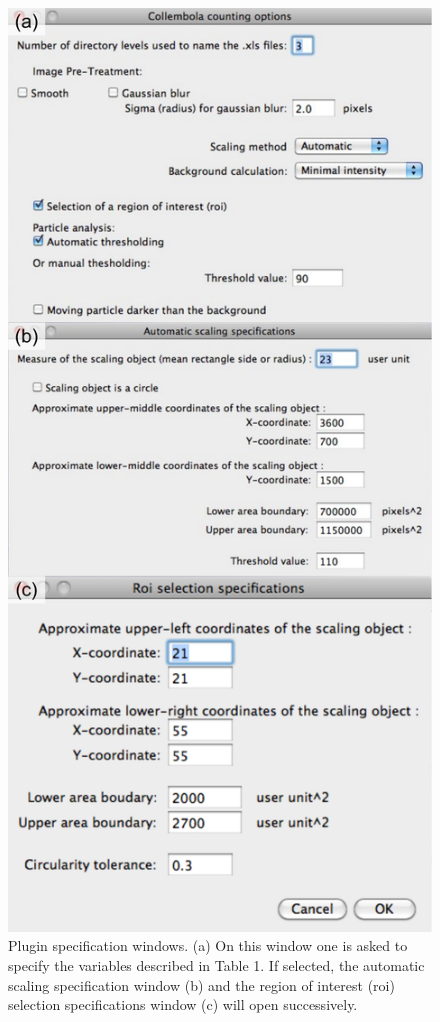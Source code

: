 \begin{figure}[!ht] %
\centering
\includegraphics[height=0.85\textheight]{2_Methodo/Fig/FigS2.pdf}
\caption[  Plugin specification windows]{ Plugin specification windows. (a) On this window one is asked to specify the variables
described in Table 1. If selected, the automatic scaling specification window
(b) and the region of interest (roi) selection specifications window (c) will
open successively.
}
\label{Fig21-S2}
\end{figure}

